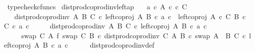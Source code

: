 \begin{isabellebody}
\ typecheck{\isacharunderscore}{\kern0pt}cfuncs%
\endisatagproof
{\isafoldproof}%
%
\isadelimproof
\isanewline
%
\endisadelimproof
\isanewline
{}\isamarkupfalse%
\ dist{\isacharunderscore}{\kern0pt}prod{\isacharunderscore}{\kern0pt}coprod{\isacharunderscore}{\kern0pt}inv{}{\isacharunderscore}{\kern0pt}left{\isacharunderscore}{\kern0pt}ap{\isacharcolon}{\kern0pt}\isanewline
\ \ \ {\isachardoublequoteopen}a\ {\isasymin}\isactrlsub c\ A{\isachardoublequoteclose}\ {\isachardoublequoteopen}c\ {\isasymin}\isactrlsub c\ C{\isachardoublequoteclose}\isanewline
\ \ \ {\isachardoublequoteopen}dist{\isacharunderscore}{\kern0pt}prod{\isacharunderscore}{\kern0pt}coprod{\isacharunderscore}{\kern0pt}inv{}\ A\ B\ C\ {\isasymcirc}\isactrlsub c\ {\isasymlangle}left{\isacharunderscore}{\kern0pt}coproj\ A\ B\ {\isasymcirc}\isactrlsub c\ a{\isacharcomma}{\kern0pt}\ c{\isasymrangle}\ {\isacharequal}{\kern0pt}\ left{\isacharunderscore}{\kern0pt}coproj\ {\isacharparenleft}{\kern0pt}A\ {\isasymtimes}\isactrlsub c\ C{\isacharparenright}{\kern0pt}\ {\isacharparenleft}{\kern0pt}B\ {\isasymtimes}\isactrlsub c\ C{\isacharparenright}{\kern0pt}\ {\isasymcirc}\isactrlsub c\ {\isasymlangle}a{\isacharcomma}{\kern0pt}\ c{\isasymrangle}{\isachardoublequoteclose}\isanewline
%
\isadelimproof
%
\endisadelimproof
%
\isatagproof
{}\isamarkupfalse%
\ {\isacharminus}{\kern0pt}\isanewline
\ \ \isamarkupfalse%
\ {\isachardoublequoteopen}dist{\isacharunderscore}{\kern0pt}prod{\isacharunderscore}{\kern0pt}coprod{\isacharunderscore}{\kern0pt}inv{}\ A\ B\ C\ {\isasymcirc}\isactrlsub c\ {\isasymlangle}left{\isacharunderscore}{\kern0pt}coproj\ A\ B\ {\isasymcirc}\isactrlsub c\ a{\isacharcomma}{\kern0pt}\ c{\isasymrangle}\isanewline
\ \ \ \ {\isacharequal}{\kern0pt}\ {\isacharparenleft}{\kern0pt}{\isacharparenleft}{\kern0pt}swap\ C\ A\ {\isasymbowtie}\isactrlsub f\ swap\ C\ B{\isacharparenright}{\kern0pt}\ {\isasymcirc}\isactrlsub c\ dist{\isacharunderscore}{\kern0pt}prod{\isacharunderscore}{\kern0pt}coprod{\isacharunderscore}{\kern0pt}inv\ C\ A\ B\ {\isasymcirc}\isactrlsub c\ swap\ {\isacharparenleft}{\kern0pt}A\ {\isasymCoprod}\ B{\isacharparenright}{\kern0pt}\ C{\isacharparenright}{\kern0pt}\ {\isasymcirc}\isactrlsub c\ {\isasymlangle}left{\isacharunderscore}{\kern0pt}coproj\ A\ B\ {\isasymcirc}\isactrlsub c\ a{\isacharcomma}{\kern0pt}\ c{\isasymrangle}{\isachardoublequoteclose}\isanewline
\ \ \ \ \isamarkupfalse%
\ dist{\isacharunderscore}{\kern0pt}prod{\isacharunderscore}{\kern0pt}coprod{\isacharunderscore}{\kern0pt}inv{}{\isacharunderscore}{\kern0pt}def\ \isamarkupfalse%

\end{isabellebody}
